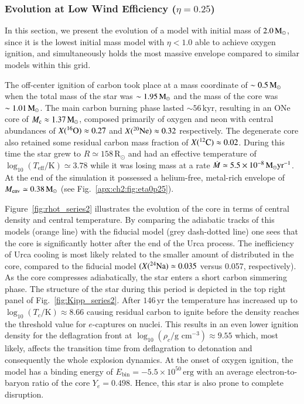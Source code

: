 \documentclass[main.tex]{subfiles}
\begin{document}
\subsubsection{Evolution at Low Wind Efficiency ($\eta = 0.25$)}\label{sec:ch2:eta_0p25_evolution}
In this section, we present the evolution of a \seriestwo model with initial mass of $2.0\msun$, since it is the lowest initial mass model with $\eta < 1.0$ able to achieve oxygen ignition, and simultaneously holds the most massive envelope compared to similar models within this grid.

The off-center ignition of carbon took place at a mass coordinate of $\sim 0.5\msun$ when the total mass of the star was $\sim 1.95\msun$ and the mass of the core was $\sim 1.01\msun$. The main carbon burning phase lasted $\sim 56\,\text{kyr}$, resulting in an ONe core of $M_{\rm c} \approx 1.37\msun$, composed primarily of oxygen and neon with central abundances of $X(\iso{O}{16}) \approx 0.27$ and $X(\iso{Ne}{20}) \approx 0.32$ respectively. The degenerate core also retained some residual carbon mass fraction of $X(\iso{C}{12}) \approx 0.02$. During this time the star grew to $R \simeq 158$\,R$_\odot$ and had an effective temperature of $\log_{10} (T_{\text{eff}} / \text{K}) \simeq 3.78$ while it was losing mass at a rate $\dot{M} \simeq 5.5 \times 10^{-8}\msun \text{yr}^{-1}$. At the end of the simulation it possessed a helium-free, metal-rich envelope of $M_{\text{env}} \simeq 0.38\msun$  (see Fig.~\ref{apx:ch2:fig:eta0p25}).

Figure~\ref{fig:rhot_series2} illustrates the evolution of the core in 
terms of central density and central temperature. By comparing the 
adiabatic tracks of this models (orange line) with the \seriesone 
fiducial model (grey dash-dotted line) one sees that the core is 
significantly hotter after the end of the Urca process. The 
inefficiency of Urca cooling is most likely related to the smaller amount of  distributed in the core, compared to the \seriesone fiducial model $(X(\iso{Na}{24}) \simeq 0.035$ versus 0.057,  respectively).
As the core compresses adiabatically, the star enters a short carbon simmering phase. 
The structure of the star during this period is depicted in the top 
right panel of Fig.~\ref{fig:Kipp_series2}. After $146\,\text{yr}$ 
the temperature has increased up to $\log_{10} (T_c / \text{K}) \approx 8.66$ causing  residual carbon to ignite before the density reaches the threshold value for $e$-captures on  nuclei. This results in an even lower ignition density for the deflagration front at $\log_{10} (\rho_c / \text{g cm}^{-3}) \approx 9.55$ which, most likely,  affects the transition time from deflagration to detonation and consequently the whole explosion dynamics. At the onset of oxygen ignition, the model has a binding energy of $E_{\text{bin}} = - 5.5 \times 10^{50}\,\text{erg}$ with an average electron-to-baryon ratio of the core $Y_e = 0.498$. Hence, this star is also prone to complete disruption. 
\end{document}
